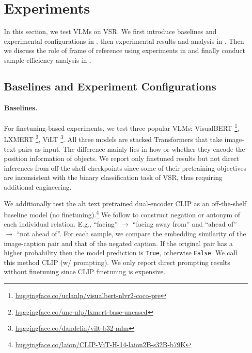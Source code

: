 \section{Experiments}\label{sec:exp}

In this section, we test VLMs on VSR. We first introduce baselines and experimental configurations in , then experimental results and analysis in . Then we discuss the role of frame of reference using experiments in  and finally conduct sample efficiency analysis in .

\subsection{Baselines and Experiment Configurations}\label{sec:baseline}

\paragraph{Baselines.} For finetuning-based experiments, we test three popular VLMs: VisualBERT \citep{li2019visualbert}\footnote{\href{https://huggingface.co/uclanlp/visualbert-nlvr2-coco-pre}{huggingface.co/uclanlp/visualbert-nlvr2-coco-pre}}, 
LXMERT \citep{tan2019lxmert}\footnote{\href{https://huggingface.co/unc-nlp/lxmert-base-uncased}{huggingface.co/unc-nlp/lxmert-base-uncased}},
ViLT \citep{kim2021vilt}\footnote{\href{https://huggingface.co/dandelin/vilt-b32-mlm}{huggingface.co/dandelin/vilt-b32-mlm}}. All three models are stacked Transformers \citep{vaswani2017attention} that take image-text pairs as input. The difference mainly lies in how or whether they encode the position information of objects. We report only finetuned results but not direct inferences from off-the-shelf checkpoints since some of their pretraining objectives are inconsistent with the binary classification task of VSR, thus requiring additional engineering.

We additionally test the alt text pretrained dual-encoder CLIP \citep{radford2021learning} as an off-the-shelf baseline model (no finetuning).\footnote{\href{https://huggingface.co/laion/CLIP-ViT-H-14-laion2B-s32B-b79K}{huggingface.co/laion/CLIP-ViT-H-14-laion2B-s32B-b79K}} We follow \citet{clip_vsr} to construct negation or antonym of each individual relation. E.g., ``facing'' $\rightarrow$ ``facing away from'' and ``ahead of'' $\rightarrow$ ``not ahead of''. For each sample, we compare the embedding similarity of the image-caption pair and that of the negated caption. If the original pair has a higher probability then the model prediction is \texttt{True}, otherwise \texttt{False}. We call this method CLIP (w/ prompting). We only report direct prompting results without finetuning since CLIP finetuning is expensive.









